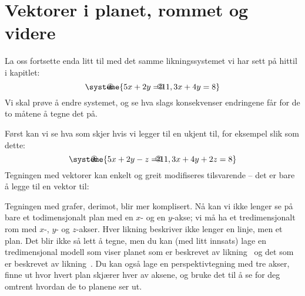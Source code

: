 \section*{Vektorer i planet, rommet og videre}

La oss fortsette enda litt til med det samme likningssystemet vi har
sett på hittil i kapitlet:
\[
\systeme{
\makebox[0pt][l]{\hspace{-2em}\En} 5x + 2y = 11,
\makebox[0pt][l]{\hspace{-2em}\To} 3x + 4y = 8
}
\]
Vi skal prøve å endre systemet, og se hva slags konsekvenser
endringene får for de to måtene å tegne det på.

Først kan vi se hva som skjer hvis vi legger til en ukjent til, for
eksempel slik som dette:
\[
\systeme{
\makebox[0pt][l]{\hspace{-2em}\En} 5x + 2y -  z = 11,
\makebox[0pt][l]{\hspace{-2em}\To} 3x + 4y + 2z = 8
}
\]
Tegningen med vektorer kan enkelt og greit modifiseres tilsvarende --
det er bare å legge til en vektor til:
\begin{center}
\end{center}
Tegningen med grafer, derimot, blir mer komplisert.  Nå kan vi ikke
lenger se på bare et todimensjonalt plan med en $x$- og en $y$-akse;
vi må ha et tredimensjonalt rom med $x$-, $y$- og $z$-akser.  Hver
likning beskriver ikke lenger en linje, men et plan.  Det blir ikke så
lett å tegne, men du kan (med litt innsats) lage en tredimensjonal
modell som viser planet som er beskrevet av likning~\En{} og det som
er beskrevet av likning~\To.  Du kan også lage en perspektivtegning
med tre akser, finne ut hvor hvert plan skjærer hver av aksene, og
bruke det til å se for deg omtrent hvordan de to planene ser ut.

